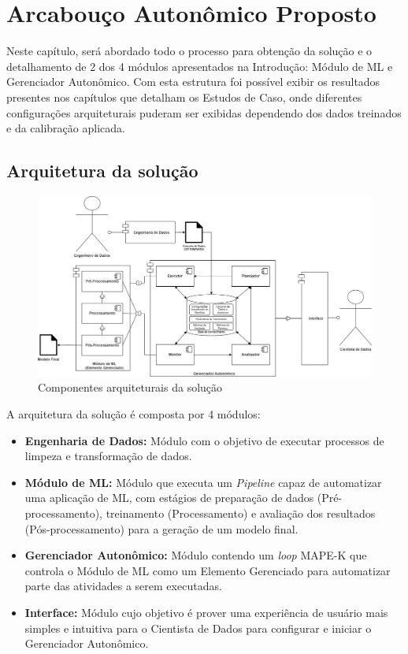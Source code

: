 \documentclass[portugues]{ic-tese}
\begin{document}
\chapter{Arcabouço Autonômico Proposto}
\label{sec:metodologia}

Neste capítulo, será abordado todo o processo para obtenção da solução e o detalhamento de 2 dos 4 módulos apresentados na Introdução: Módulo de ML e Gerenciador Autonômico. Com esta estrutura foi possível exibir os resultados presentes nos capítulos que detalham os Estudos de Caso, onde diferentes configurações arquiteturais puderam ser exibidas dependendo dos dados treinados e da calibração aplicada.

\section{Arquitetura da solução}

\begin{figure}[h]
\centering
\includegraphics[scale=0.4]{images/Arcabouco_Autonomico_Proposto.jpg}
\caption {Componentes arquiteturais da solução}
\label{fig:ComponentesArquiteturais}
\end{figure}

A arquitetura da solução é composta por 4 módulos:

\begin{itemize}
    \item {\textbf{Engenharia de Dados:}} Módulo com o objetivo de executar processos de limpeza e transformação de dados.
	\item {\textbf{Módulo de ML:}} Módulo que executa um \textit{Pipeline} capaz de automatizar uma aplicação de ML, com estágios de preparação de dados (Pré-processamento), treinamento (Processamento) e avaliação dos resultados (Pós-processamento) para a geração de um modelo final.
     \item {\textbf{Gerenciador Autonômico:}} Módulo contendo um \textit{loop} MAPE-K que controla o Módulo de ML como um Elemento Gerenciado para automatizar parte das atividades a serem executadas.
     \item {\textbf{Interface:}} Módulo cujo objetivo é prover uma experiência de usuário mais simples e intuitiva para o Cientista de Dados para configurar e iniciar o Gerenciador Autonômico.
\end{itemize}
\end{document}
